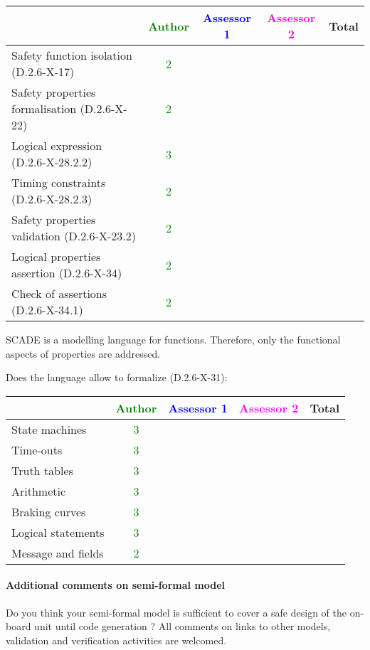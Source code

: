 \begin{tabular}{|l | c | c | c | c|}
\hline
& \textcolor{green}{Author} & \textcolor{blue}{Assessor 1} & \textcolor{magenta}{Assessor 2} & Total \\
\hline 
Safety function isolation (D.2.6-X-17)  &  \textcolor{green}{2}& & &  \\
\hline 
Safety properties formalisation (D.2.6-X-22)  &  \textcolor{green}{2}& & &  \\
\hline
Logical expression (D.2.6-X-28.2.2)  &  \textcolor{green}{3}& & &  \\
\hline
Timing constraints (D.2.6-X-28.2.3)  &  \textcolor{green}{2} & & &  \\
\hline
Safety properties validation (D.2.6-X-23.2)  &  \textcolor{green}{2}& & &  \\
\hline
Logical properties assertion (D.2.6-X-34)  &  \textcolor{green}{2}& & &  \\
\hline
Check  of assertions (D.2.6-X-34.1)  &  \textcolor{green}{2}& & &  \\
\hline
\end{tabular}

\begin{author_comment}
SCADE is a modelling language for functions. Therefore, only the functional aspects of properties are addressed.  
\end{author_comment}

Does the language allow to  formalize (D.2.6-X-31):

\begin{tabular}{|l | c | c | c | c|}
\hline
& \textcolor{green}{Author} & \textcolor{blue}{Assessor 1} & \textcolor{magenta}{Assessor 2} & Total \\
\hline 
State machines  & \textcolor{green}{3} & & &  \\
\hline
Time-outs  & \textcolor{green}{3} & & &  \\
\hline
Truth tables  & \textcolor{green}{3} & & &  \\
\hline
Arithmetic  & \textcolor{green}{3} & & &  \\
\hline
Braking curves  & \textcolor{green}{3} & & &  \\
\hline
Logical statements & \textcolor{green}{3} & & &  \\
\hline
Message and fields & \textcolor{green}{2} & & &  \\
\hline
\end{tabular}

\paragraph{Additional comments on semi-formal  model} Do you think your semi-formal  model is sufficient to cover a safe design of the on-board unit until code generation ?
All comments on links to  other models, validation and verification activities are welcomed.


